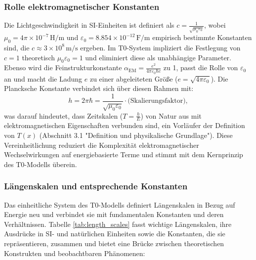 \documentclass[12pt,a4paper]{article}
\newcommand{\Tfield}{T(x)}
\newcommand{\alphaEM}{\alpha_{\text{EM}}}
\begin{document}
	\subsubsection{Rolle elektromagnetischer Konstanten}
	Die Lichtgeschwindigkeit in SI-Einheiten ist definiert als \(c = \frac{1}{\sqrt{\mu_0\varepsilon_0}}\), wobei \(\mu_0 = 4\pi \times 10^{-7} \, \text{H/m}\) und \(\varepsilon_0 = 8.854 \times 10^{-12} \, \text{F/m}\) empirisch bestimmte Konstanten sind, die \(c \approx 3 \times 10^8 \, \text{m/s}\) ergeben. Im T0-System impliziert die Festlegung von \(c = 1\) theoretisch \(\mu_0\varepsilon_0 = 1\) und eliminiert diese als unabhängige Parameter. Ebenso wird die Feinstrukturkonstante \(\alphaEM = \frac{e^2}{4\pi\varepsilon_0\hbar c}\) zu 1, passt die Rolle von \(\varepsilon_0\) an und macht die Ladung \(e\) zu einer abgeleiteten Größe (\(e = \sqrt{4\pi\varepsilon_0}\)). Die Plancksche Konstante verbindet sich über diesen Rahmen mit:
	\begin{equation}
		h = 2\pi\hbar = \frac{1}{\sqrt{\mu_0\varepsilon_0}} \cdot \text{(Skalierungsfaktor)},
		\label{eq:planck_em}
	\end{equation}
	was darauf hindeutet, dass Zeitskalen (\(T = \frac{h}{E}\)) von Natur aus mit elektromagnetischen Eigenschaften verbunden sind, ein Vorläufer der Definition von \(\Tfield\) (Abschnitt 3.1 "Definition und physikalische Grundlage"). Diese Vereinheitlichung reduziert die Komplexität elektromagnetischer Wechselwirkungen auf energiebasierte Terme und stimmt mit dem Kernprinzip des T0-Modells überein.
	
	\subsubsection{Längenskalen und entsprechende Konstanten}
	\label{subsec:length_scales}
	
	Das einheitliche System des T0-Modells definiert Längenskalen in Bezug auf Energie neu und verbindet sie mit fundamentalen Konstanten und deren Verhältnissen. Tabelle \ref{tab:length_scales} fasst wichtige Längenskalen, ihre Ausdrücke in SI- und natürlichen Einheiten sowie die Konstanten, die sie repräsentieren, zusammen und bietet eine Brücke zwischen theoretischen Konstrukten und beobachtbaren Phänomenen:
	
\end{document}
